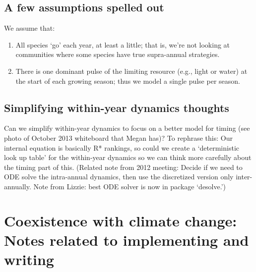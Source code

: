 \documentclass[11pt,a4paper,oneside]{article}
\begin{document}
\subsection{A few assumptions spelled out}
\noindent We assume that:
\begin{enumerate}
\item All species `go' each year, at least a little; that is, we're
  not looking at communities where some species have true
  supra-annual strategies.
\item There is one dominant pulse of the limiting resource (e.g.,
  light or water) at the
  start of each growing season; thus we model a  single pulse per
  season.
\end{enumerate}

\subsection{Simplifying within-year dynamics thoughts}
Can we simplify within-year dynamics to focus on a better model for timing (see photo of October 2013 whiteboard that Megan has)? To rephrase this: Our internal equation is basically R* rankings, so could we create a `deterministic look up table' for the within-year dynamics so we can think more carefully about the timing part of this.  (Related note from 2012 meeting: Decide if we need to ODE solve the intra-annual
  dynamics, then use the discretized version only inter-annually. Note from Lizzie: best ODE solver is now in package `desolve.')

\section{Coexistence with climate change: Notes related to implementing and writing}\label{genoutline}
\end{document}
